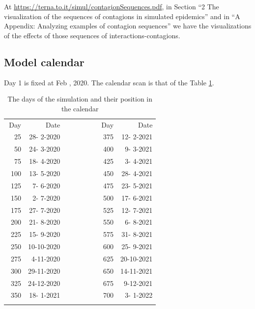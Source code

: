 \documentclass[graybox]{svmult}
\begin{document}
At \url{https://terna.to.it/simul/contagionSequences.pdf}, in Section ``2 The visualization of the sequences of contagions in simulated epidemics'' and in ``A Appendix: Analyzing examples of contagion sequences'' we have the visualizations of the effects of those sequences of interactions-contagions.


\subsection{Model calendar}\label{calend}

Day 1 is fixed at Feb , 2020. The calendar scan is that of the Table \ref{dates}.

\begin{table}[t]
\begin{footnotesize}
\begin{tabular}{rrrrr}
\hline\noalign{\smallskip}
 Day & Date  &~~~~~~~~& Day & Date \\
 \noalign{\smallskip}\svhline\noalign{\smallskip}
 25 & 28- 2-2020 & & 375 & 12- 2-2021 \\
 50 & 24- 3-2020 & & 400 &  9- 3-2021 \\
 75 & 18- 4-2020 & & 425 &  3- 4-2021 \\
100 & 13- 5-2020 & & 450 & 28- 4-2021 \\
125 &  7- 6-2020 & & 475 & 23- 5-2021 \\
150 &  2- 7-2020 & & 500 & 17- 6-2021 \\
175 & 27- 7-2020 & & 525 & 12- 7-2021 \\
200 & 21- 8-2020 & & 550 &  6- 8-2021 \\
225 & 15- 9-2020 & & 575 & 31- 8-2021 \\
250 & 10-10-2020 & & 600 & 25- 9-2021 \\\
275 &  4-11-2020 & & 625 & 20-10-2021 \\
300 & 29-11-2020 & & 650 & 14-11-2021 \\
325 & 24-12-2020 & & 675 &  9-12-2021 \\
350 & 18- 1-2021 & & 700 &  3- 1-2022 \\
\hline\noalign{\smallskip}
\end{tabular}
\end{footnotesize}
\caption{The days of the simulation and their position in the calendar}
\label{dates}
\end{table}






\end{document}
